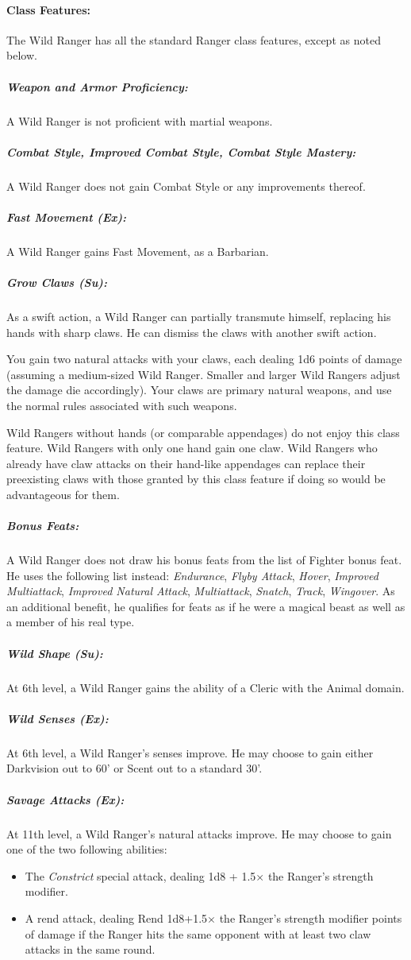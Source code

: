 \paragraph{Class Features:}
The Wild Ranger has all the standard Ranger class features, except as noted below.
\subparagraph{Weapon and Armor Proficiency:} 
A Wild Ranger is not proficient with martial weapons.

\subparagraph{Combat Style, Improved Combat Style, Combat Style Mastery:}
A Wild Ranger does not gain Combat Style or any improvements thereof.

\subparagraph{Fast Movement (Ex):}
A Wild Ranger gains Fast Movement, as a Barbarian.

\subparagraph{Grow Claws (Su):}
As a swift action, a Wild Ranger can partially transmute himself, replacing his hands with sharp claws. He can dismiss the claws with another swift action.

You gain two natural attacks with your claws, each dealing 1d6 points of damage (assuming a medium-sized Wild Ranger. Smaller and larger Wild Rangers adjust the damage die accordingly). Your claws are primary natural weapons, and use the normal rules associated with such weapons.

Wild Rangers without hands (or comparable appendages) do not enjoy this class feature. Wild Rangers with only one hand gain one claw. Wild Rangers who already have claw attacks on their hand-like appendages can replace their preexisting claws with those granted by this class feature if doing so would be advantageous for them.

\subparagraph{Bonus Feats:} A Wild Ranger does not draw his bonus feats from the list of Fighter bonus feat. He uses the following list instead: \emph{Endurance}, \emph{Flyby Attack}, \emph{Hover}, \emph{Improved Multiattack}, \emph{Improved Natural Attack}, \emph{Multiattack}, \emph{Snatch}, \emph{Track}, \emph{Wingover}. As an additional benefit, he qualifies for feats as if he were a magical beast as well as a member of his real type.

\subparagraph{Wild Shape (Su):} At 6th level, a Wild Ranger gains the  ability of a Cleric with the Animal domain.

\subparagraph{Wild Senses (Ex):} At 6th level, a Wild Ranger's senses improve. He may choose to gain either Darkvision out to 60' or Scent out to a standard 30'.

\subparagraph{Savage Attacks (Ex): } At 11th level, a Wild Ranger's natural attacks improve. He may choose to gain one of the two following abilities:
\begin{itemize}
 \item The \emph{Constrict} special attack, dealing 1d8 + 1.5$\times$ the Ranger's strength modifier.
 \item A rend attack, dealing Rend 1d8+1.5$\times$ the Ranger's strength modifier points of damage if the Ranger hits the same opponent with at least two claw attacks in the same round.
\end{itemize}
